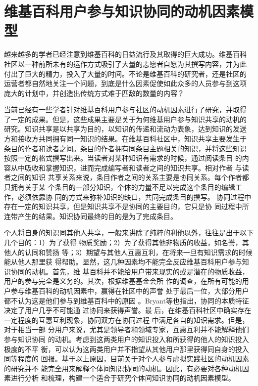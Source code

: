 
\chapter{维基百科用户参与知识协同的动机因素模型}
\label{cha:motivation}



越来越多的学者已经注意到维基百科的日益流行及其取得的巨大成功。维基百科
社区以一种前所未有的运作方式吸引了大量的志愿者自愿为其撰写内容，并为此
付出了巨大的精力，投入了大量的时间。不论是维基百科的研究者，还是社区的
运营者都自然地关注一个问题，到底是什么因素促使如此众多的人员参与到这项
庞大的计划中，并创造出传统方式难于匹敌的数量的内容？

当前已经有一些学者针对维基百科用户参与社区的动机因素进行了研究，并取得
了一定的成果。但是，这些成果主要是关于为何维基用户参与知识共享的动机的
研究。知识共享是以共享为目的，以知识的传递和流动为表象，达到知识的发送
方和接收方共同拥有同一知识的结果。在维基百科社区中，知识共享主要发生于
条目的作者和读者之间。条目的作者拥有同条目主题相关的知识，并将这些知识
按照一定的格式撰写出来。当读者对某种知识有需求的时候，通过阅读条目
的内容从中吸收和掌握知识，进而完成编写者和读者之间的知识共享。相对作者
与读者之间的知识
共享关系来说，条目作者之间的关系主要是协同关系。每个作者都只拥有关于某
个条目的一部分知识，个体的力量不足以完成这个条目的编辑工作，必须依靠协
同的方式来弥补知识的缺口，共同完成条目的撰写。
协同过程中存在一定的知识共享，但是知识共享不是协同的主要目的，它只是协
同过程中所连带产生的结果。知识协同最终的目的是为了完成条目。

个人将自身的知识同其他人共享，一般来讲除了纯粹的利他以外，往往是出于以下几个目的：1）为了获得
物质奖励；2）为了获得其他非物质的收益，如名誉，其他人的认同和赞扬
等；3）期望与其他人互惠互利，在将来一旦有知识需求的时候能从他人那里获
得帮助\cite{Zhugea}。显然，这几种因素均不能完全反应维基百科用户参与知识协同的动机。首先，维
基百科并不能给用户带来现实的或是潜在的物质收益，用户的参与完全是义务的。其次，根据维基基金会所
作的调查，在所有可能的用户参与维基百科的动机因素中，赢得在社区中的声誉
处于最后一位，大部分用户都不认为这是他们参与到维基百科中的原因
\cite{Glott2009}。Bryant等也指出，协同的本质特征决定了用户几乎不可能通
过协同来获得声誉\cite{1099205}。最
后，在维基百科社区中确实存在一定程度的互惠互利现象，协同双方在协同过程
中满足各自的知识需求。但是，对于相当一部
分用户来说，尤其是领导者和领域专家，互惠互利并不能解释他们参与知识协同
的动机。考虑到这两类用户的知识投入和所获得的他人的知识投入极度的不平
衡，可以认为这两类用户并不指望从其他用户那里获得同自身的投入同等程度的
回报。基于以上原因，目前关于对个人参与虚拟实践社区的动机因素的研究并不
能完全用来解释个体间知识协同的动机。因此，有必要对各种动机因素进行分析
和梳理，构建一个适合于研究个体间知识协同的动机因素模型。

